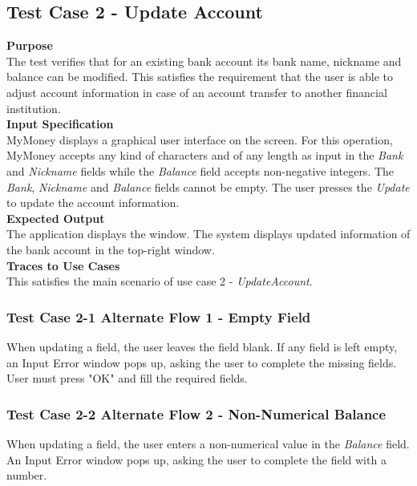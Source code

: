 \documentclass[12pt]{article}
\begin{document}
\clearpage
\subsection{Test Case 2 - Update Account} \label{TC-2}
\noindent
{\bf Purpose}\\
        The test verifies that for an existing bank account its bank name, nickname and balance can be modified.
        This satisfies the requirement that the user is able to adjust account information in case of an account transfer
        to another financial institution. \\

\noindent
{\bf Input Specification}\\
            MyMoney displays a graphical user interface on the screen.
            For this operation, MyMoney accepts any kind of characters and of any length as
            input in the \textit{Bank} and \textit{Nickname} fields while the \textit{Balance} field accepts non-negative integers.
            The \textit{Bank}, \textit{Nickname} and \textit{Balance} fields cannot be empty. The user presses the \textit{Update} to update the account information.\\
            
\noindent
{\bf Expected Output}\\
    The application displays the window.    
    The system displays updated information of the bank account in the top-right window.\\

 \noindent
 {\bf Traces to Use Cases}\\
     This satisfies the main scenario of use case 2 - \textit{UpdateAccount}.\\
     
\subsubsection
{Test Case 2-1 Alternate Flow 1 - Empty Field}
\noindent
When updating a field, the user leaves the field blank.
If any field is left empty, an Input Error window pops up, asking the user to complete the missing fields. User must press "OK" and fill the required fields.

\subsubsection
{Test Case 2-2 Alternate Flow 2 - Non-Numerical Balance}
\noindent
When updating a field, the user enters a non-numerical value in the \textit{Balance} field. 
An Input Error window pops up, asking the user to complete the field with a number. 
\end{document}
